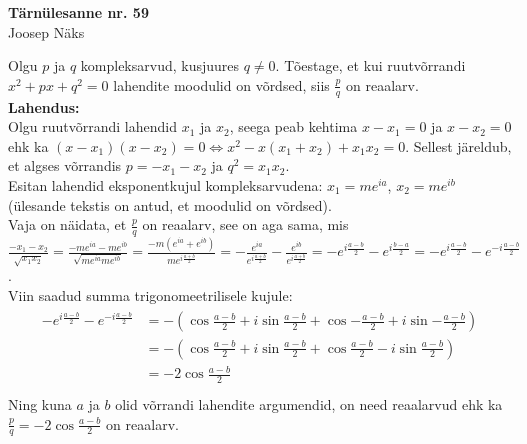 \documentclass{article}
\begin{document}
\begin{center}
\Large\textbf{Tärnülesanne nr. 59}\\
\small{Joosep Näks}
\end{center}
Olgu $p$ ja $q$ kompleksarvud, kusjuures $q\neq 0$. Tõestage, et kui ruutvõrrandi $x^2+px+q^2=0$ lahendite moodulid on võrdsed, siis $\frac{p}{q}$ on reaalarv.\\
\textbf{Lahendus:}\\
Olgu ruutvõrrandi lahendid $x_1$ ja $x_2$, seega peab kehtima $x-x_1=0$ ja $x-x_2=0$ ehk ka $(x-x_1)(x-x_2)=0\Leftrightarrow x^2-x(x_1+x_2)+x_1x_2=0$. Sellest järeldub, et algses võrrandis $p=-x_1-x_2$ ja $q^2=x_1x_2$.\\
Esitan lahendid eksponentkujul kompleksarvudena: $x_1=me^{ia}$, $x_2=me^{ib}$ (ülesande tekstis on antud, et moodulid on võrdsed).\\
Vaja on näidata, et $\frac{p}{q}$ on reaalarv, see on aga sama, mis $\frac{-x_1-x_2}{\sqrt{x_1x_2}}=\frac{-me^{ia}-me^{ib}}{\sqrt{me^{ia}me^{ib}}}=\frac{-m(e^{ia}+e^{ib})}{me^{i\frac{a+b}{2}}}=-\frac{e^{ia}}{e^{i\frac{a+b}{2}}}-\frac{e^{ib}}{e^{i\frac{a+b}{2}}}=-e^{i\frac{a-b}{2}}-e^{i\frac{b-a}{2}}=-e^{i\frac{a-b}{2}}-e^{-i\frac{a-b}{2}}$.\\
Viin saadud summa trigonomeetrilisele kujule:\\
\begin{gather*}
\begin{aligned}
-e^{i\frac{a-b}{2}}-e^{-i\frac{a-b}{2}}&=-\left(\cos{\frac{a-b}{2}}+i\sin{\frac{a-b}{2}}+\cos{-\frac{a-b}{2}}+i\sin{-\frac{a-b}{2}}\right)\\
&=-\left(\cos{\frac{a-b}{2}}+i\sin{\frac{a-b}{2}}+\cos{\frac{a-b}{2}}-i\sin{\frac{a-b}{2}}\right)\\
&=-2\cos{\frac{a-b}{2}}\\
\end{aligned}
\end{gather*}
Ning kuna $a$ ja $b$ olid võrrandi lahendite argumendid, on need reaalarvud ehk ka $\frac{p}{q}=-2\cos\frac{a-b}{2}$ on reaalarv.
\end{document}
